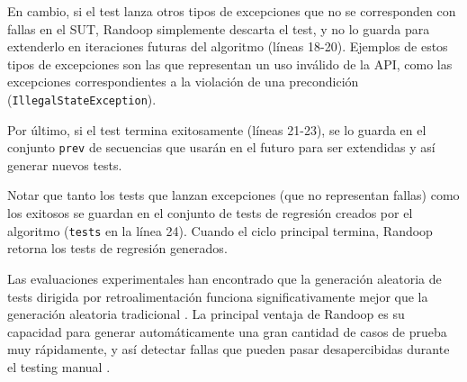 En cambio, si el test lanza otros tipos de excepciones que no se corresponden
con fallas en el SUT, \textsf{Randoop} simplemente descarta el test, y no lo guarda para
extenderlo en iteraciones futuras del algoritmo (líneas 18-20). Ejemplos de
estos tipos de excepciones son las que representan un uso inválido de la API,
como las excepciones correspondientes a la violación de una
precondición (\texttt{IllegalStateException}).

Por último, si el test termina exitosamente (líneas 21-23), se lo guarda en el
conjunto \texttt{prev} de secuencias que usarán en el futuro para ser extendidas
y así generar nuevos tests. 

Notar que tanto los tests que lanzan excepciones (que no representan fallas) como los 
exitosos se guardan en el conjunto de tests de regresión creados por el
algoritmo (\texttt{tests} en la línea 24). Cuando el ciclo principal termina,
\textsf{Randoop} retorna los tests de regresión generados.

Las evaluaciones experimentales han encontrado que la generación aleatoria de tests dirigida 
por retroalimentación funciona significativamente mejor que la generación
aleatoria tradicional \cite{Pacheco07,Pacheco08}.
La principal ventaja de \textsf{Randoop} es su capacidad para generar
automáticamente una gran cantidad de casos de prueba muy rápidamente, y así 
detectar fallas que pueden pasar desapercibidas durante el testing
manual \cite{Pacheco07,Pacheco08}.








%




